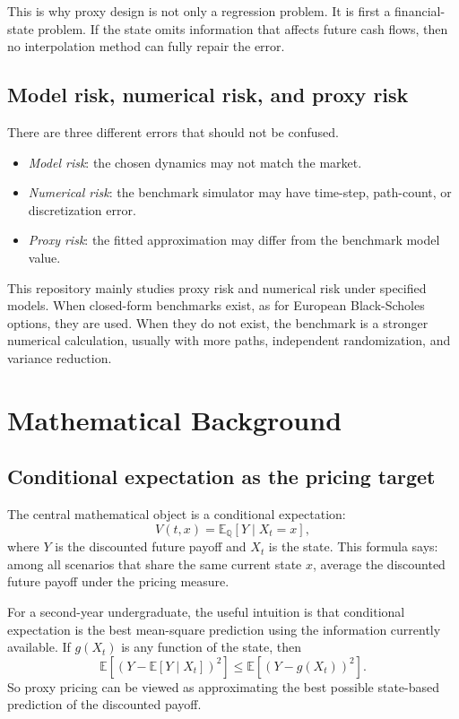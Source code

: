 \documentclass[11pt,oneside]{book}
\theoremstyle{definition}
\newcommand{\E}{\mathbb{E}}
\newcommand{\Q}{\mathbb{Q}}
\begin{document}
This is why proxy design is not only a regression problem. It is first a financial-state problem. If the state omits information that affects future cash flows, then no interpolation method can fully repair the error.

\section{Model risk, numerical risk, and proxy risk}
There are three different errors that should not be confused.
\begin{itemize}
  \item \emph{Model risk}: the chosen dynamics may not match the market.
  \item \emph{Numerical risk}: the benchmark simulator may have time-step, path-count, or discretization error.
  \item \emph{Proxy risk}: the fitted approximation may differ from the benchmark model value.
\end{itemize}
This repository mainly studies proxy risk and numerical risk under specified models. When closed-form benchmarks exist, as for European Black-Scholes options, they are used. When they do not exist, the benchmark is a stronger numerical calculation, usually with more paths, independent randomization, and variance reduction.

\chapter{Mathematical Background}

\section{Conditional expectation as the pricing target}
The central mathematical object is a conditional expectation:
\[
  V(t,x)=\E_\Q[Y\mid X_t=x],
\]
where \(Y\) is the discounted future payoff and \(X_t\) is the state. This formula says: among all scenarios that share the same current state \(x\), average the discounted future payoff under the pricing measure.

For a second-year undergraduate, the useful intuition is that conditional expectation is the best mean-square prediction using the information currently available. If \(g(X_t)\) is any function of the state, then
\[
  \E\!\left[(Y-\E[Y\mid X_t])^2\right]
  \le
  \E\!\left[(Y-g(X_t))^2\right].
\]
So proxy pricing can be viewed as approximating the best possible state-based prediction of the discounted payoff.
\end{document}
